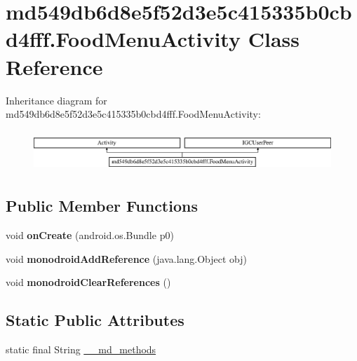 \hypertarget{classmd549db6d8e5f52d3e5c415335b0cbd4fff_1_1_food_menu_activity}{}\section{md549db6d8e5f52d3e5c415335b0cbd4fff.\+Food\+Menu\+Activity Class Reference}
\label{classmd549db6d8e5f52d3e5c415335b0cbd4fff_1_1_food_menu_activity}
Inheritance diagram for md549db6d8e5f52d3e5c415335b0cbd4fff.\+Food\+Menu\+Activity\+:\begin{figure}[H]
\begin{center}
\leavevmode
\includegraphics[height=1.546961cm]{classmd549db6d8e5f52d3e5c415335b0cbd4fff_1_1_food_menu_activity}
\end{center}
\end{figure}
\subsection*{Public Member Functions}
\begin{DoxyCompactItemize}
\item 
\mbox{\label{classmd549db6d8e5f52d3e5c415335b0cbd4fff_1_1_food_menu_activity_a63f49026034bc125913c6999e82357d3}} 
void {\bfseries on\+Create} (android.\+os.\+Bundle p0)
\item 
\mbox{\label{classmd549db6d8e5f52d3e5c415335b0cbd4fff_1_1_food_menu_activity_aeeb0ed4d68c72e77142097389efdac09}} 
void {\bfseries monodroid\+Add\+Reference} (java.\+lang.\+Object obj)
\item 
\mbox{\label{classmd549db6d8e5f52d3e5c415335b0cbd4fff_1_1_food_menu_activity_a85d7f2ff1ecb61fa3761ccad703a35cd}} 
void {\bfseries monodroid\+Clear\+References} ()
\end{DoxyCompactItemize}
\subsection*{Static Public Attributes}
\begin{DoxyCompactItemize}
\item 
static final String \hyperlink{classmd549db6d8e5f52d3e5c415335b0cbd4fff_1_1_food_menu_activity_aaa9d4e3a72d7a27b325921fcb52cc76c}{\+\_\+\+\_\+md\+\_\+methods}
\end{DoxyCompactItemize}


